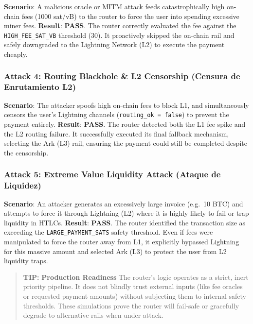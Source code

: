 \documentclass[
]{article}
\begin{document}
\textbf{Scenario}: A malicious oracle or MITM attack feeds
catastrophically high on-chain fees (1000 sat/vB) to the router to force
the user into spending excessive miner fees. \textbf{Result}:
\textbf{PASS}. The router correctly evaluated the fee against the
\texttt{HIGH\_FEE\_SAT\_VB} threshold (30). It proactively skipped the
on-chain rail and safely downgraded to the Lightning Network (L2) to
execute the payment cheaply.

\hypertarget{attack-4-routing-blackhole-l2-censorship-censura-de-enrutamiento-l2}{%
\subsubsection{Attack 4: Routing Blackhole \& L2 Censorship (Censura de
Enrutamiento
L2)}\label{attack-4-routing-blackhole-l2-censorship-censura-de-enrutamiento-l2}}

\textbf{Scenario}: The attacker spoofs high on-chain fees to block L1,
and simultaneously censors the user's Lightning channels
(\texttt{routing\_ok\ =\ false}) to prevent the payment entirely.
\textbf{Result}: \textbf{PASS}. The router detected both the L1 fee
spike and the L2 routing failure. It successfully executed its final
fallback mechanism, selecting the Ark (L3) rail, ensuring the payment
could still be completed despite the censorship.

\hypertarget{attack-5-extreme-value-liquidity-attack-ataque-de-liquidez}{%
\subsubsection{Attack 5: Extreme Value Liquidity Attack (Ataque de
Liquidez)}\label{attack-5-extreme-value-liquidity-attack-ataque-de-liquidez}}

\textbf{Scenario}: An attacker generates an excessively large invoice
(e.g.~10 BTC) and attempts to force it through Lightning (L2) where it
is highly likely to fail or trap liquidity in HTLCs. \textbf{Result}:
\textbf{PASS}. The router identified the transaction size as exceeding
the \texttt{LARGE\_PAYMENT\_SATS} safety threshold. Even if fees were
manipulated to force the router away from L1, it explicitly bypassed
Lightning for this massive amount and selected Ark (L3) to protect the
user from L2 liquidity traps.

\begin{quote}
\textbf{TIP:} \textbf{Production Readiness} The router's logic operates
as a strict, inert priority pipeline. It does not blindly trust external
inputs (like fee oracles or requested payment amounts) without
subjecting them to internal safety thresholds. These simulations prove
the router will fail-safe or gracefully degrade to alternative rails
when under attack.
\end{quote}
\end{document}
